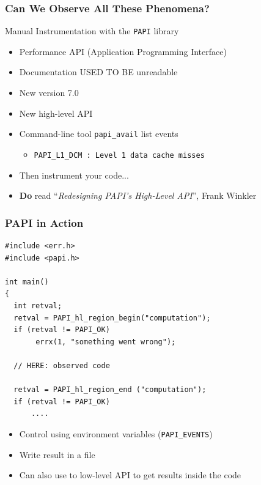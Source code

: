 \documentclass[xcolor={x11names,svgnames}]{beamer}
\begin{document}

\begin{frame}
  \frametitle{Can We Observe All These Phenomena?}


  \begin{alertblock}{Manual Instrumentation with the \texttt{PAPI} library}
    \begin{itemize}
    \item Performance API (Application Programming Interface)
    \item Documentation USED TO BE unreadable
    \item New version 7.0
    \item New high-level API
    \item Command-line tool \texttt{papi\_avail} list events
      \begin{itemize}
      \item \texttt{PAPI\_L1\_DCM  : Level 1 data cache misses}
      \end{itemize}
    \item Then instrument your code...
    \item \textbf{Do} read ``\textit{Redesigning PAPI’s High-Level API}'', Frank Winkler
    \end{itemize}
  \end{alertblock}
\end{frame}



\begin{frame}[fragile=singleslide]
  \frametitle{PAPI in Action}
  
\begin{verbatim}
#include <err.h>
#include <papi.h>
  
int main()
{
  int retval;
  retval = PAPI_hl_region_begin("computation");
  if (retval != PAPI_OK)
       errx(1, "something went wrong");

  // HERE: observed code 

  retval = PAPI_hl_region_end ("computation");
  if (retval != PAPI_OK)
      ....
\end{verbatim}

\begin{itemize}
\item Control using environment variables (\texttt{PAPI\_EVENTS})
\item Write result in a file
\item Can also use to low-level API to get results inside the code
\end{itemize}


\end{frame}
  
\end{document}
